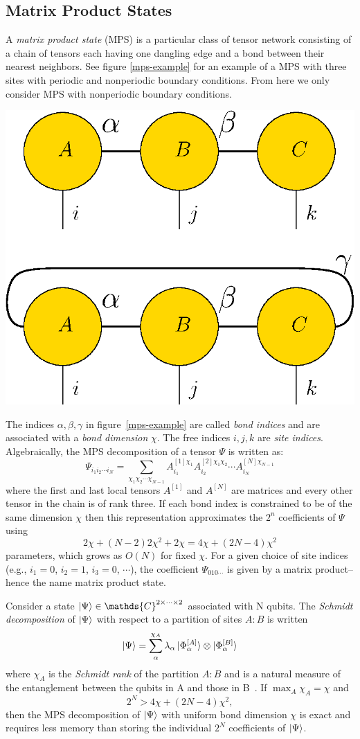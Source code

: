 \documentclass[12pt]{article}
\newenvironment{Figure}
  {\par\medskip\noindent\minipage{\linewidth}}
  {\endminipage\par\medskip}
\begin{document}
\begin{multicols}{2}
\section{Matrix Product States}
	A \textit{matrix product state} (MPS) is a particular class
	of
	tensor network consisting of a chain of tensors each having one
	dangling edge and a bond between their nearest neighbors. See figure
	\ref{mps-example} for an example of a MPS with three sites with
	periodic and nonperiodic boundary conditions. From here we only
	consider MPS with nonperiodic boundary conditions.
	\begin{Figure}
		\center\includegraphics[width=.55\textwidth]{./Figures/mps-example.eps}
		\label{mps-example}
	\end{Figure}
	The indices $\alpha,\beta,\gamma$ in figure~\ref{mps-example} are called
	\textit{bond indices} and are associated with a
	\textit{bond dimension} $\chi$. The free indices $i,j,k$ are
	\textit{site indices}. Algebraically, the MPS decomposition of a tensor $\Psi$ is written as:
	$$\Psi_{i_1i_2\cdots i_N}=\sum_{\chi_1\chi_2\cdots\chi_{N-1}}A^{[1]\chi_1}_{i_1}A_{i_2}^{[2]\chi_1\chi_2}\cdots A^{[N]\chi_{N-1}}_{i_N}$$
	where the first and last local tensors $A^{[1]}$ and $A^{[N]}$ are
	matrices and every other tensor in the chain is of rank three. If
	each bond index is constrained to be of the same dimension $\chi$ then
	this representation approximates the $2^n$ coefficients of $\Psi$ using
	$$2\chi+(N-2)2\chi^2+2\chi=4\chi+(2N-4)\chi^2$$
	parameters, which grows as $O(N)$ for fixed $\chi$.
	For a given choice of site indices (e.g., $i_1=0$, $i_2=1$, $i_3=0$,
	$\cdots$), the coefficient $\Psi_{010\cdots}$ is given by a matrix
	product-- hence the name matrix product state.

	Consider a state $\ket{\Psi}\in\mathds{C}^{2\times\cdots\times2}$
	associated with N qubits.
	The \textit{Schmidt decomposition} of $\ket{\Psi}$ with respect to a
	partition of sites $A:B$ is written
	$$\ket{\Psi}=\sum_\alpha^{\chi_A}\lambda_\alpha\ket{\Phi_\alpha^{[A]}}\otimes\ket{\Phi_\alpha^{[B]}}$$
	where $\chi_A$ is the \textit{Schmidt rank} of the partition $A:B$
	and is a natural measure of the entanglement between the qubits in A
	and those in B~\cite{Vidal}. If $\max_A\chi_A=\chi$ and
	$$2^N>4\chi+(2N-4)\chi^2,$$
	then the MPS decomposition of $\ket{\Psi}$ with uniform bond
	dimension $\chi$ is exact and requires less memory than storing the
	individual $2^N$ coefficients of $\ket{\Psi}$.


\end{multicols}
\end{document}
